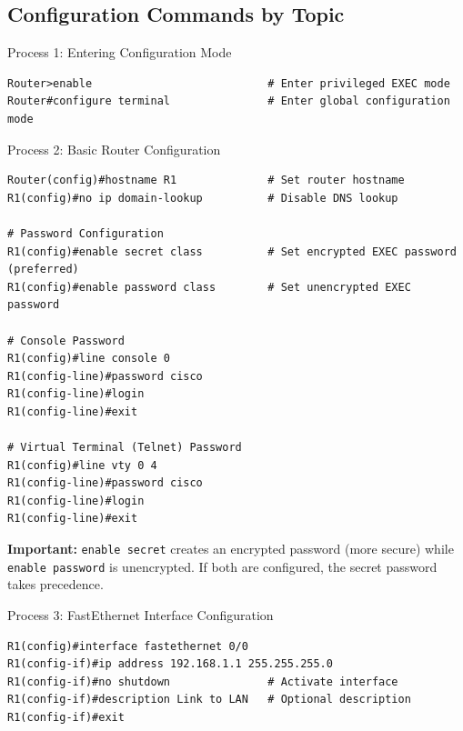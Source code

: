 \documentclass[12pt,a4paper]{article}
\begin{document}
\subsection{Configuration Commands by Topic}

\begin{commandbox}{Process 1: Entering Configuration Mode}
\begin{lstlisting}
Router>enable                           # Enter privileged EXEC mode
Router#configure terminal               # Enter global configuration mode
\end{lstlisting}
\end{commandbox}

\begin{commandbox}{Process 2: Basic Router Configuration}
\begin{lstlisting}
Router(config)#hostname R1              # Set router hostname
R1(config)#no ip domain-lookup          # Disable DNS lookup

# Password Configuration
R1(config)#enable secret class          # Set encrypted EXEC password (preferred)
R1(config)#enable password class        # Set unencrypted EXEC password

# Console Password
R1(config)#line console 0
R1(config-line)#password cisco
R1(config-line)#login
R1(config-line)#exit

# Virtual Terminal (Telnet) Password
R1(config)#line vty 0 4
R1(config-line)#password cisco
R1(config-line)#login
R1(config-line)#exit
\end{lstlisting}
\end{commandbox}

\begin{notebox}
\textbf{Important:} \texttt{enable secret} creates an encrypted password (more secure) while \texttt{enable password} is unencrypted. If both are configured, the secret password takes precedence.
\end{notebox}

\begin{commandbox}{Process 3: FastEthernet Interface Configuration}
\begin{lstlisting}
R1(config)#interface fastethernet 0/0
R1(config-if)#ip address 192.168.1.1 255.255.255.0
R1(config-if)#no shutdown               # Activate interface
R1(config-if)#description Link to LAN   # Optional description
R1(config-if)#exit
\end{lstlisting}
\end{commandbox}
\end{document}
